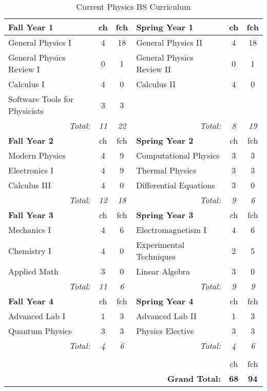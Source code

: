 \documentclass[12pt,preprint]{aastex}
\begin{document}
\newpage
\begin{longtable}{lcclcc}
\caption{Current Physics BS Curriculum}\label{table:currentbs} \\   
\hline
{\bf Fall Year 1} & {\sc ch} & {\sc fch} & {\bf Spring Year 1} & {\sc ch} & {\sc fch} \\
\hline
\hline
General Physics I             & 4 & 18 & General Physics II        & 4 & 18 \\
General Physics Review I      & 0 &  1 & General Physics Review II & 0 & 1  \\
Calculus I                    & 4 & 0 & Calculus II                & 4 & 0  \\
Software Tools for Physicists & 3 & 3 &                            &   &    \\
\multicolumn{1}{r}{\emph{Total:}} & \emph{11} & \emph{22} &
\multicolumn{1}{r}{\emph{Total:}} & \emph{8}  & \emph{19} \\

\hline
{\bf Fall Year 2} & {\sc ch} & {\sc fch} & {\bf Spring Year 2} & {\sc ch} & {\sc fch} \\
\hline
\hline
Modern Physics & 4 & 9 & Computational Physics  & 3 & 3 \\
Electronics I  & 4 & 9 & Thermal Physics        & 3 & 3 \\
Calculus III   & 4 & 0 & Differential Equations & 3 & 0 \\
\multicolumn{1}{r}{\emph{Total:}} & \emph{12} & \emph{18} & 
\multicolumn{1}{r}{\emph{Total:}} & \emph{9}  & \emph{6}  \\ 

\hline
{\bf Fall Year 3} & {\sc ch} & {\sc fch} & {\bf Spring Year 3} & {\sc ch} & {\sc fch}  \\
\hline
\hline
Mechanics I  & 4 & 6 & Electromagnetism I      & 4 & 6 \\
Chemistry I  & 4 & 0 & Experimental Techniques & 2 & 5 \\
Applied Math & 3 & 0 & Linear Algebra          & 3 & 0 \\
\multicolumn{1}{r}{\emph{Total:}} & \emph{11} & \emph{6} &
\multicolumn{1}{r}{\emph{Total:}} & \emph{9} & \emph{9} \\  

\hline
{\bf Fall Year 4} & {\sc ch} & {\sc fch} &  {\bf Spring Year 4} & {\sc ch} & {\sc fch} \\
\hline
\hline
Advanced Lab I  & 1 & 3 & Advanced Lab II  & 1 & 3 \\
Quantum Physics & 3 & 3 & Physics Elective & 3 & 3 \\
\multicolumn{1}{r}{\emph{Total:}} & \emph{4} & \emph{6} &
\multicolumn{1}{r}{\emph{Total:}} & \emph{4} & \emph{6} \\
\hline \\
 &   &   &  & {\sc ch} & {\sc fch} \\  
 &   &   & \multicolumn{1}{r}{{\bf Grand Total:}} & {\bf 68} & {\bf 94} \\  
\end{longtable}
\end{document}
